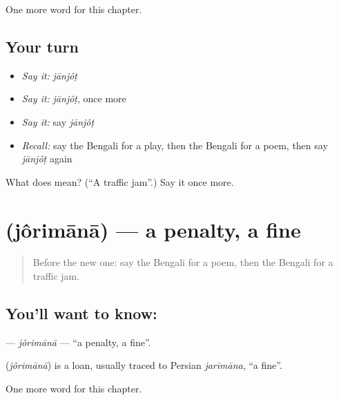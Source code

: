 \begin{grammarlens}[title={What you've built}]
One more word for this chapter.
\end{grammarlens}

\subsection*{Your turn}
\begin{itemize}
\raggedright
  \item \emph{Say it:} \emph{jānjôṭ}
  \item \emph{Say it:} \emph{jānjôṭ}, once more
  \item \emph{Say it:} say \emph{jānjôṭ}
  \item \emph{Recall:} say the Bengali for a play, then the Bengali for a poem, then say \emph{jānjôṭ} again
\end{itemize}

\begin{tcolorbox}[breakable,colback=teal!4,colframe=teal!35!black,title={Before you move on}]
What does  mean? (\textquotedblleft{}A traffic jam\textquotedblright{}.) Say it once more.
\end{tcolorbox}
\section[\texorpdfstring{\bn{জরিমানা} (jôrimānā)}{জরিমানা (jôrimānā)}]{ (jôrimānā) — a penalty, a fine}

\label{lesson:BN-C226-jorimana}



\begin{quote}
Before the new one: say the Bengali for a poem, then the Bengali for a traffic jam.
\end{quote}

\subsection*{You'll want to know: }
\textbf{} — \emph{jôrimānā} — \textquotedblleft{}a penalty, a fine\textquotedblright{}.

\begin{cousinweb}
\textbf{} (\emph{jôrimānā}) is a loan, usually traced to Persian \emph{jarīmāna}, \textquotedblleft{}a fine\textquotedblright{}.
\end{cousinweb}

\begin{grammarlens}[title={What you've built}]
One more word for this chapter.
\end{grammarlens}

